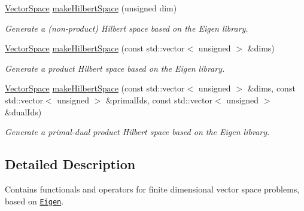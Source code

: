 \begin{DoxyCompactItemize}
\item 
\hyperlink{classSpacy_1_1VectorSpace}{\-Vector\-Space} \hyperlink{namespaceSpacy_1_1Rn_abadd5b9e11793fdb2f689a3ee908e5e7}{make\-Hilbert\-Space} (unsigned dim)
\begin{DoxyCompactList}\small\item\em \-Generate a (non-\/product) \-Hilbert space based on the \-Eigen library. \end{DoxyCompactList}\item 
\hypertarget{namespaceSpacy_1_1Rn_a4e9d4ebff60dde8a465a464531af13e1}{\hyperlink{classSpacy_1_1VectorSpace}{\-Vector\-Space} \hyperlink{namespaceSpacy_1_1Rn_a4e9d4ebff60dde8a465a464531af13e1}{make\-Hilbert\-Space} (const std\-::vector$<$ unsigned $>$ \&dims)}\label{namespaceSpacy_1_1Rn_a4e9d4ebff60dde8a465a464531af13e1}

\begin{DoxyCompactList}\small\item\em \-Generate a product \-Hilbert space based on the \-Eigen library. \end{DoxyCompactList}\item 
\hypertarget{namespaceSpacy_1_1Rn_a5df449d080e704158ff479c36634ee74}{\hyperlink{classSpacy_1_1VectorSpace}{\-Vector\-Space} \hyperlink{namespaceSpacy_1_1Rn_a5df449d080e704158ff479c36634ee74}{make\-Hilbert\-Space} (const std\-::vector$<$ unsigned $>$ \&dims, const std\-::vector$<$ unsigned $>$ \&primal\-Ids, const std\-::vector$<$ unsigned $>$ \&dual\-Ids)}\label{namespaceSpacy_1_1Rn_a5df449d080e704158ff479c36634ee74}

\begin{DoxyCompactList}\small\item\em \-Generate a primal-\/dual product \-Hilbert space based on the \-Eigen library. \end{DoxyCompactList}\end{DoxyCompactItemize}


\subsection{\-Detailed \-Description}
\-Contains functionals and operators for finite dimensional vector space problems, based on \href{http://eigen.tuxfamily.org}{\tt \-Eigen}. 

